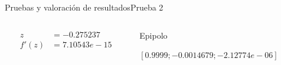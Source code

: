 \documentclass[aspectratio=169,14pt,spanish]{beamer}
\begin{document}
\begin{frame}{Pruebas y valoración de resultados}{Prueba 2}
\begin{overlayarea}{\textwidth}{8cm}
{\begin{figure}[ht!]
            \end{figure}
            \begin{columns}
              \begin{column}{0.2\textwidth}
                \begin{align*}
                  z &= -0.275237 \\
                  f'(z) &= 7.10543e-15
                \end{align*}

              \end{column}
              \begin{column}{0.8\textwidth}
                Epipolo

                $[0.9999; -0.0014679; -2.12774e-06]$
              \end{column}
            \end{columns}

            }

        \end{overlayarea}

      \end{frame}
\end{document}
